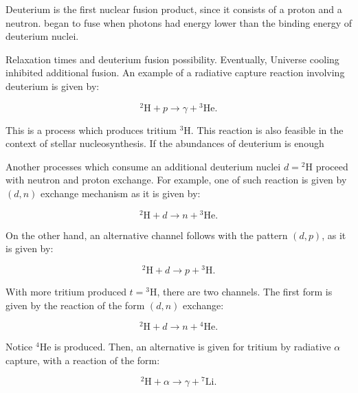 \documentclass[openany]{book}
\begin{document}
Deuterium is the first nuclear fusion product, since it  consists of a proton and a neutron. began to fuse when photons had  energy lower than the binding energy of deuterium nuclei. 

Relaxation times and deuterium fusion possibility. Eventually, Universe cooling inhibited additional fusion. An example of a radiative capture reaction involving deuterium is given by:

\begin{equation} \label{eq:reaction_2Hpradiative}
	\mathrm{{}^{2}H} + p \rightarrow \gamma + \mathrm{{}^{3}He}.
\end{equation}

This is a process which produces tritium $\mathrm{{}^{3}H}$. This reaction is also feasible in the context of stellar nucleosynthesis. If the abundances of deuterium  is enough 

Another processes which consume an additional deuterium nuclei $d = \mathrm{{}^{2}H}$ proceed with neutron and proton exchange. For example, one of such reaction is given by $(d, n)$ exchange mechanism as it is given by: 

\begin{equation} \label{eq:reaction_2Hdn}
	\mathrm{{}^{2}H} + d \rightarrow n + \mathrm{{}^{3}He}.
\end{equation}

On the other hand, an alternative channel follows with the pattern $(d, p)$, as it is given by: 

\begin{equation} \label{eq:reaction_2Hdp}
	\mathrm{{}^{2}H} + d \rightarrow p + \mathrm{{}^{3}H}.
\end{equation}
 
 With more tritium produced $t =  \mathrm{{}^{3} H}$, there are two channels. The first form is given by the reaction of the form $(d, n)$ exchange: 
 
  \begin{equation} \label{eq:reaction_3Hd}
  	\mathrm{{}^{2}H} + d \rightarrow n + \mathrm{{}^{4}He}.
  \end{equation}

Notice $\mathrm{{}^{4}He}$ is produced. Then, an alternative is given for tritium by radiative $\alpha$ capture, with a reaction of the form: 

\begin{equation} \label{eq:reaction_3Halpha}
 	\mathrm{{}^{2}H} + \alpha \rightarrow \gamma + \mathrm{{}^{7}Li}.
\end{equation}
\end{document}
